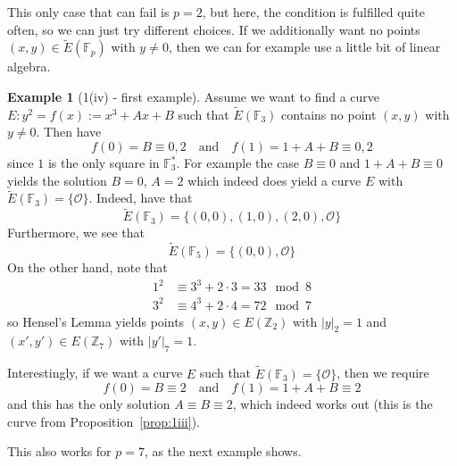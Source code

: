 \documentclass{scrartcl}
\newcommand{\Z}{\mathbb{Z}}
\newcommand{\F}{\mathbb{F}}
\renewcommand{\O}{\mathcal{O}}
\theoremstyle{definition}
\newtheorem{example}[subsection]{Example}
\begin{document}
This only case that can fail is $p = 2$, but here, the condition is fulfilled quite often, so we can just try different choices.
If we additionally want no points $(x, y) \in \tilde{E}(\F_p)$ with $y \neq 0$, then we can for example use a little bit of linear algebra.
\begin{example}[1(iv) - first example]
    Assume we want to find a curve $E: y^2 = f(x) := x^3 + A x + B$ such that $\tilde{E}(\F_3)$ contains no point $(x, y)$ with $y \neq 0$.
    Then have
    \begin{equation*}
        f(0) = B \equiv 0, 2  \quad \text{and} \quad f(1) = 1 + A + B \equiv 0, 2
    \end{equation*}
    since $1$ is the only square in $\F_3^*$.
    For example the case $B \equiv 0$ and $1 + A + B \equiv 0$ yields the solution $B = 0$, $A = 2$ which indeed does yield a curve $E$ with $\tilde{E}(\F_3) = \{ \O \}$.
    Indeed, have that
    \begin{equation*}
        \tilde{E}(\F_3) = \{ (0, 0), (1, 0), (2, 0), \O \}
    \end{equation*}
    Furthermore, we see that
    \begin{equation*}
        \tilde{E}(\F_5) = \{ (0, 0), \O \}
    \end{equation*}
    On the other hand, note that
    \begin{align*}
        1^2 &\equiv 3^3 + 2 \cdot 3 = 33 \mod 8 \\
        3^2 &\equiv 4^3 + 2 \cdot 4 = 72 \mod 7
    \end{align*}
    so Hensel's Lemma yields \cite[Thm 1.15]{lecture} points $(x, y) \in E(\Z_2)$ with $|y|_2 = 1$ and $(x', y') \in E(\Z_7)$ with $|y'|_7 = 1$.

    Interestingly, if we want a curve $E$ such that $\tilde{E}(\F_3) = \{ \O \}$, then we require
    \begin{equation*}
        f(0) = B \equiv 2  \quad \text{and} \quad f(1) = 1 + A + B \equiv 2
    \end{equation*}
    and this has the only solution $A \equiv B \equiv 2$, which indeed works out (this is the curve from Proposition~\ref{prop:1iii}).
\end{example}
This also works for $p = 7$, as the next example shows.
\end{document}
